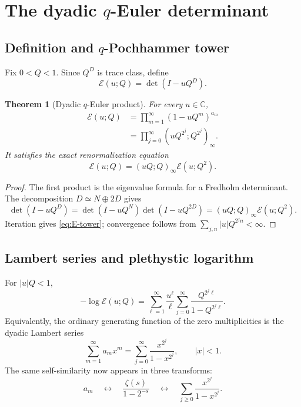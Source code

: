 \documentclass[11pt,oneside]{article}
\numberwithin{equation}{section}
\theoremstyle{plain}
\newtheorem{theorem}{Theorem}[section]
\theoremstyle{definition}
\theoremstyle{remark}
\newcommand{\C}{\mathbb C}
\newcommand{\Ecal}{\mathscr E}
\begin{document}
\section{The dyadic $q$-Euler determinant}

\subsection{Definition and $q$-Pochhammer tower}

Fix $0<Q<1$.  Since $Q^D$ is trace class, define
\begin{equation}\label{eq:E-def}
 \Ecal(u;Q)=\det(I-uQ^D).
\end{equation}

\begin{theorem}[Dyadic $q$-Euler product]\label{thm:E-product}
For every $u\in\C$,
\begin{align}
 \Ecal(u;Q)
 &=\prod_{m=1}^{\infty}(1-uQ^m)^{a_m}\label{eq:E-mult}\\
 &=\prod_{j=0}^{\infty}(uQ^{2^j};Q^{2^j})_\infty.\label{eq:E-tower}
\end{align}
It satisfies the exact renormalization equation
\begin{equation}\label{eq:E-scale}
 \boxed{\ \Ecal(u;Q)=(uQ;Q)_\infty\Ecal(u;Q^2).\ }
\end{equation}
\end{theorem}

\begin{proof}
The first product is the eigenvalue formula for a Fredholm determinant.  The decomposition $D\simeq N\oplus2D$ gives
\[
 \det(I-uQ^D)=\det(I-uQ^N)\det(I-uQ^{2D})
 =(uQ;Q)_\infty\Ecal(u;Q^2).
\]
Iteration gives \cref{eq:E-tower}; convergence follows from $\sum_{j,n}|u|Q^{2^jn}<\infty$.
\end{proof}

\subsection{Lambert series and plethystic logarithm}

For $|u|Q<1$,
\begin{equation}\label{eq:E-log}
 -\log\Ecal(u;Q)
 =\sum_{\ell=1}^{\infty}\frac{u^\ell}{\ell}
 \sum_{j=0}^{\infty}\frac{Q^{2^j\ell}}{1-Q^{2^j\ell}}.
\end{equation}
Equivalently, the ordinary generating function of the zero multiplicities is the dyadic Lambert series
\begin{equation}\label{eq:a-ogf}
 \boxed{\ \sum_{m=1}^{\infty}a_mx^m
 =\sum_{j=0}^{\infty}\frac{x^{2^j}}{1-x^{2^j}},\qquad |x|<1.\ }
\end{equation}
The same self-similarity now appears in three transforms:
\[
 a_m\quad\longleftrightarrow\quad
 \frac{\zeta(s)}{1-2^{-s}}
 \quad\longleftrightarrow\quad
 \sum_{j\ge0}\frac{x^{2^j}}{1-x^{2^j}}.
\]
\end{document}

